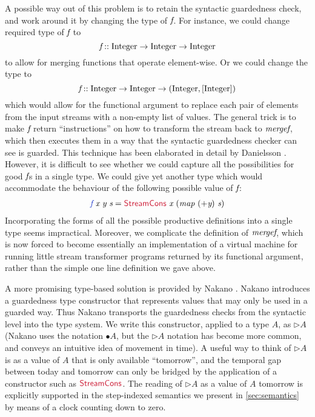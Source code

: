 A possible way out of this problem is to retain the syntactic
guardedness check, and work around it by changing the type of
$\textit{f}$. For instance, we could change required type of
$\textit{f}$ to
\begin{displaymath}
  \textit{f} :: \textrm{Integer} \to \textrm{Integer} \to \textrm{Integer}
\end{displaymath}
to allow for merging functions that operate element-wise. Or we could
change the type to
\begin{displaymath}
  \textit{f} :: \textrm{Integer} \to \textrm{Integer} \to (\textrm{Integer}, [\textrm{Integer}])
\end{displaymath}
which would allow for the functional argument to replace each pair of
elements from the input streams with a non-empty list of values. The
general trick is to make $\textit{f}$ return ``instructions'' on how to
transform the stream back to $\textit{mergef}$, which then executes
them in a way that the syntactic guardedness checker can see is
guarded. This technique has been elaborated in detail by Danielsson
\cite{danielsson10beating}. However, it is difficult to see whether we
could capture all the possibilities for good $\textit{f}$s in a single
type. We could give yet another type which would accommodate the
behaviour of the following possible value of $\textit{f}$:
\begin{displaymath}
  \begin{array}{l}
    \defn{f}\ \ident{x}\ \ident{y}\ \ident{s} = \cons{StreamCons}\ \ident{x}\ (\ident{map}\ (+\ident{y})\ \ident{s})
  \end{array}
\end{displaymath}
Incorporating the forms of all the possible productive definitions
into a single type seems impractical. Moreover, we complicate the
definition of $\textit{mergef}$, which is now forced to become
essentially an implementation of a virtual machine for running little
stream transformer programs returned by its functional argument,
rather than the simple one line definition we gave above.

A more promising type-based solution is provided by Nakano
\cite{nakano00modality}. Nakano introduces a guardedness type
constructor that represents values that may only be used in a guarded
way. Thus Nakano transports the guardedness checks from the syntactic
level into the type system. We write this constructor, applied to a
type $A$, as $\rhd A$ (Nakano uses the notation $\bullet A$, but the
$\rhd A$ notation has become more common, and conveys an intuitive
idea of movement in time). A useful way to think of $\rhd A$ is as a
value of $A$ that is only available ``tomorrow'', and the temporal gap
between today and tomorrow can only be bridged by the application of a
constructor such as $\cons{StreamCons}$. The reading of $\rhd A$ as a
value of $A$ tomorrow is explicitly supported in the step-indexed
semantics we present in \autoref{sec:semantics} by means of a clock
counting down to zero.

